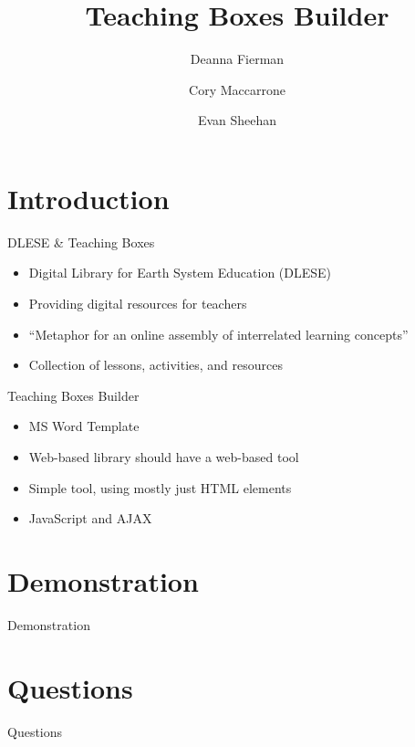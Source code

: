\documentclass[style=horatio,mode=present,paper=screen]{powerdot}
\title{Teaching Boxes Builder}
\author{
	Deanna Fierman
	\and
	Cory Maccarrone
	\and
	Evan Sheehan
}
\begin{document}
\maketitle

\section[slide=false]{Introduction}
\begin{slide}{DLESE \& Teaching Boxes}
\begin{itemize}
\item Digital Library for Earth System Education (DLESE)
\item Providing digital resources for teachers
\item ``Metaphor for an online assembly of interrelated learning concepts''
\item Collection of lessons, activities, and resources
\end{itemize}
\end{slide}

\begin{slide}{Teaching Boxes Builder}
\begin{itemize}
\item MS Word Template
\item Web-based library should have a web-based tool
\item Simple tool, using mostly just HTML elements
\item JavaScript and AJAX
\end{itemize}
\end{slide}

\section[slide=false]{Demonstration}
\begin{slide}[toc=,bm=]{Demonstration}
\end{slide}

\section[slide=false]{Questions}
\begin{slide}[toc=,bm=]{Questions}
\end{slide}
\end{document}
